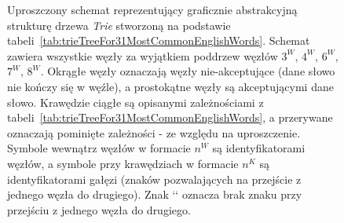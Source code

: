 	\begin{figure}
		\caption{Uproszczony schemat reprezentujący graficznie abstrakcyjną strukturę drzewa \emph{Trie} stworzoną na podstawie tabeli~\ref{tab:trieTreeFor31MostCommonEnglishWords}. Schemat zawiera wszystkie węzły za wyjątkiem poddrzew węzłów $3^W$, $4^W$, $6^W$, $7^W$, $8^W$. Okrągłe węzły oznaczają węzły nie-akceptujące (dane słowo nie kończy się w węźle), a prostokątne węzły są akceptującymi dane słowo. Krawędzie ciągłe są opisanymi zależnościami z tabeli~\ref{tab:trieTreeFor31MostCommonEnglishWords}, a przerywane oznaczają pominięte zależności - ze względu na uproszczenie. Symbole wewnątrz węzłów w formacie $n^W$ są identyfikatorami węzłów, a symbole przy krawędziach w formacie $n^K$ są identyfikatorami gałęzi (znaków pozwalających na przejście z jednego węzła do drugiego). Znak `\textunderscore` oznacza brak znaku przy przejściu z jednego węzła do drugiego.}\label{fig:CompleteTrieTree}
		\centering 
\end{figure}
